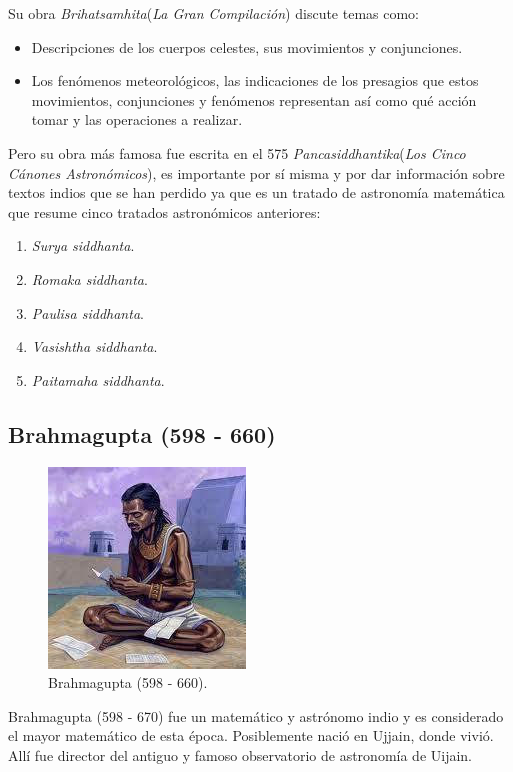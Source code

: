 \documentclass[a4paper, 11pt]{article}
\begin{document}
		Su obra \textit{Brihatsamhita}(\textit{La Gran Compilación}) discute temas como:
		\begin{itemize}
			\item Descripciones de los cuerpos celestes, sus movimientos y conjunciones.
			\item Los fenómenos meteorológicos, las indicaciones de los presagios que estos movimientos, conjunciones
			y fenómenos representan así como qué acción tomar y las operaciones a realizar.
		\end{itemize}
		
		Pero su obra más famosa fue escrita en el 575 \textit{Pancasiddhantika}(\textit{Los Cinco Cánones Astronómicos}), 
		es importante por sí misma y por dar información sobre textos indios que se han perdido ya que es un tratado
		de astronomía matemática que resume cinco tratados astronómicos anteriores:
		\begin{enumerate}
			\item \textit{Surya siddhanta}.
			\item \textit{Romaka siddhanta}.
			\item \textit{Paulisa siddhanta}.
			\item \textit{Vasishtha siddhanta}.
			\item \textit{Paitamaha siddhanta}.
		\end{enumerate}

	\subsection{Brahmagupta (598 - 660)}
		\begin{figure}[!ht]
			\centering
			\includegraphics{brahmagupta.jpg}
			\caption{Brahmagupta (598 - 660).}
			\label{fig:brahmagupta}
		\end{figure}

		Brahmagupta (598 - 670) fue un matemático y astrónomo indio y es considerado el mayor matemático de esta época.
		Posiblemente nació en Ujjain, donde vivió. Allí fue director del antiguo y famoso observatorio de astronomía de
		Uijain.
		
\end{document}
